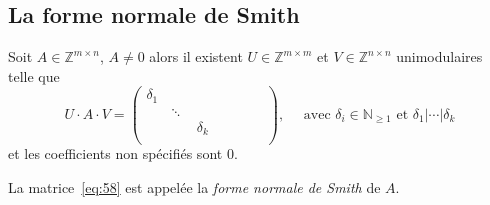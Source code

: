\subsection*{La forme normale de Smith}
\label{sec:la-forme-normale-smith}

   \begin{theorem}
    \label{thr:28c}
    Soit $A \in \mathbb{Z}^{m\times n}$, $A≠0$ alors il existent $ U \in \mathbb{Z}^{m\times m}$ et $V \in
    \mathbb{Z}^{n\times n}$ unimodulaires telle que
    \begin{equation}
      \label{eq:58}
    U⋅A⋅V = \begin{pmatrix}
      \delta _{ 1 } & \quad & \quad & \quad & \quad \\ \quad & \ddots
      & \quad & \quad & \quad \\ \quad& \quad& \delta _{ k } & \quad &
      \quad \\ \quad & \quad & \quad & \quad &\quad
    \end{pmatrix}, \quad \text{ avec } \delta_i \in
    \mathbb{N}_{\ge1} \text{ et } \delta_1| \cdots |\delta_k
  \end{equation}
  et les coefficients
    non spécifiés sont $0$. 
  \end{theorem}
  \noindent 
  La matrice~\eqref{eq:58} est appelée
  la \emph{forme normale de Smith} de $A$. 
